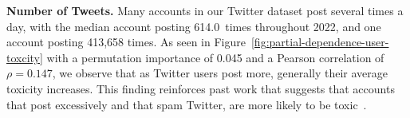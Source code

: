 \vspace{2pt}\noindent
\noindent
\textbf{Number of Tweets.}
Many accounts in our Twitter dataset post several times a day, with the median account posting 614.0~times throughout 2022, and one account posting 413,658 times. As seen in Figure~\ref{fig:partial-dependence-user-toxcity} with a permutation importance of 0.045 and a Pearson correlation of $\rho=0.147$, we observe that as Twitter users post more, generally their average toxicity increases. This finding reinforces past work that suggests that accounts that post excessively and that spam Twitter, are more likely to be toxic~\cite{salehabadi2022user}. %


